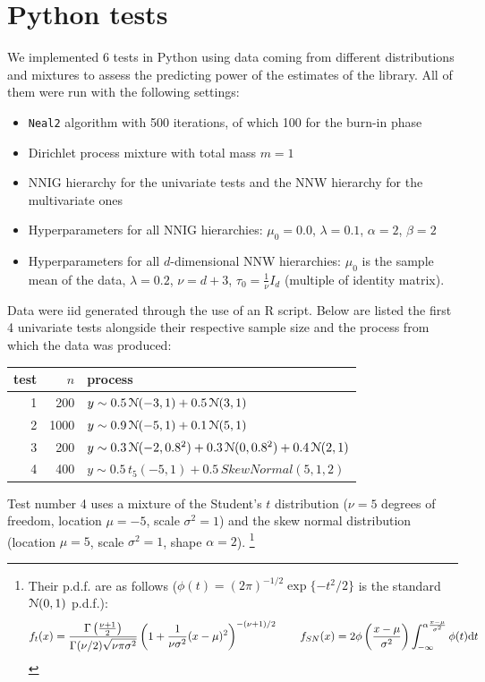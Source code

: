 \chapter{Python tests}\label{chap-py-test}
We implemented 6 tests in Python using data coming from different distributions and mixtures to assess the predicting power of the estimates of the library.
All of them were run with the following settings:
\begin{itemize}
	\item \verb|Neal2| algorithm with 500 iterations, of which 100 for the burn-in phase
	\item Dirichlet process mixture with total mass $m=1$
	\item NNIG hierarchy for the univariate tests and the NNW hierarchy for the multivariate ones
	\item Hyperparameters for all NNIG hierarchies: $\mu_0 = 0.0$, $\lambda = 0.1$, $\alpha = 2$, $\beta = 2$
	\item Hyperparameters for all $d$-dimensional NNW hierarchies: $\mu_0$ is the sample mean of the data, $\lambda = 0.2$, $\nu = d + 3$, $\tau_0 = \frac{1}{\nu} I_d$ (multiple of identity matrix).
\end{itemize}
Data were iid generated through the use of an R script.
Below are listed the first 4 univariate tests alongside their respective sample size and the process from which the data was produced:
\begin{center}
	\begin{tabular}{r|r|l}
		test & $n$ & process \\ \hline
		1 &  200 & $y \sim 0.5 \, \mathcal N(-3, 1) + 0.5 \, \mathcal N(3, 1)$ \\
		2 & 1000 & $y \sim 0.9 \, \mathcal N(-5, 1) + 0.1 \, \mathcal N(5, 1)$ \\
		3 &  200 & $y \sim 0.3 \, \mathcal N(-2, 0.8^2) + 0.3 \, \mathcal N(0, 0.8^2) + 0.4 \, \mathcal N(2, 1)$ \\
		4 &  400 & $y \sim 0.5 \, t_5(-5, 1 ) + 0.5 \, SkewNormal(5, 1, 2)$
	\end{tabular}
\end{center}
Test number 4 uses a mixture of the Student's $t$ distribution ($\nu=5$ degrees of freedom, location $\mu=-5$, scale $\sigma^2 = 1$) and the skew normal distribution (location $\mu=5$, scale $\sigma^2=1$, shape $\alpha=2$). \footnote{Their p.d.f. are as follows ($\phi(t) = (2\pi)^{-1/2} \exp\{-t^2/2\}$ is the standard $\mathcal N(0,1)$ p.d.f.):
$$ f_t(x) = \frac{\Gamma\left(\frac{\nu+1}{2}\right)}{\Gamma(\nu/2) \sqrt{\nu \pi \sigma^2}} \left( 
1+\frac{1}{\nu \sigma^2}(x-\mu)^2 \right)^{-(\nu+1)/2} \qquad
f_{SN}(x) = 2 \phi\left(\frac{x-\mu}{\sigma^2}\right) \int_{-\infty}^{\alpha \frac{x-\mu}{\sigma^2}} \phi(t) \mathrm d t
$$}
